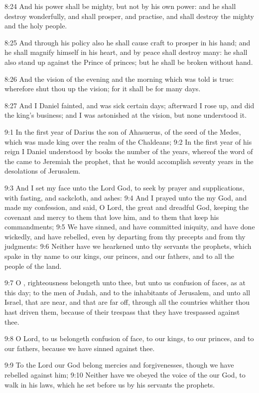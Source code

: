 8:24 And his power shall be mighty, but not by his own power: and he
shall destroy wonderfully, and shall prosper, and practise, and shall
destroy the mighty and the holy people.

8:25 And through his policy also he shall cause craft to prosper in
his hand; and he shall magnify himself in his heart, and by peace
shall destroy many: he shall also stand up against the Prince of
princes; but he shall be broken without hand.

8:26 And the vision of the evening and the morning which was told is
true: wherefore shut thou up the vision; for it shall be for many
days.

8:27 And I Daniel fainted, and was sick certain days; afterward I rose
up, and did the king's business; and I was astonished at the vision,
but none understood it.

9:1 In the first year of Darius the son of Ahasuerus, of the seed of
the Medes, which was made king over the realm of the Chaldeans; 9:2 In
the first year of his reign I Daniel understood by books the number of
the years, whereof the word of the \LORD came to Jeremiah the prophet,
that he would accomplish seventy years in the desolations of
Jerusalem.

9:3 And I set my face unto the Lord God, to seek by prayer and
supplications, with fasting, and sackcloth, and ashes: 9:4 And I
prayed unto the \LORD my God, and made my confession, and said, O Lord,
the great and dreadful God, keeping the covenant and mercy to them
that love him, and to them that keep his commandments; 9:5 We have
sinned, and have committed iniquity, and have done wickedly, and have
rebelled, even by departing from thy precepts and from thy judgments:
9:6 Neither have we hearkened unto thy servants the prophets, which
spake in thy name to our kings, our princes, and our fathers, and to
all the people of the land.

9:7 O \LORD, righteousness belongeth unto thee, but unto us confusion
of faces, as at this day; to the men of Judah, and to the inhabitants
of Jerusalem, and unto all Israel, that are near, and that are far
off, through all the countries whither thou hast driven them, because
of their trespass that they have trespassed against thee.

9:8 O Lord, to us belongeth confusion of face, to our kings, to our
princes, and to our fathers, because we have sinned against thee.

9:9 To the Lord our God belong mercies and forgivenesses, though we
have rebelled against him; 9:10 Neither have we obeyed the voice of
the \LORD our God, to walk in his laws, which he set before us by his
servants the prophets.

